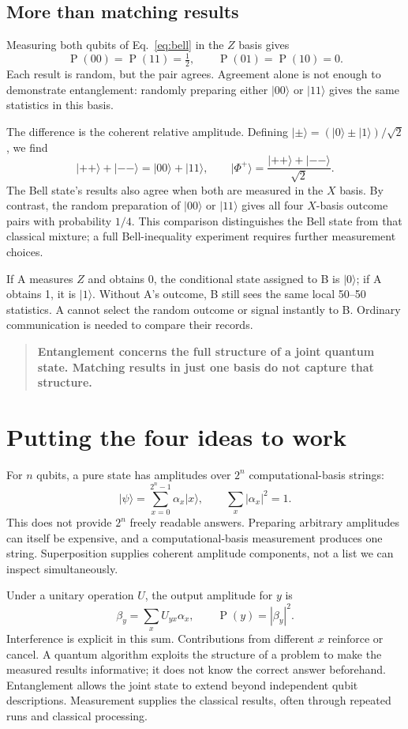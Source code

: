 \documentclass[11pt,a4paper]{article}
\newcommand{\ket}[1]{\lvert #1\rangle}
\newcommand{\Prob}{\mathop{\mathrm{P}}}
\newcommand{\takeaway}[1]{\begin{quote}\color{ink}\textbf{#1}\end{quote}}
\begin{document}
\subsection{More than matching results}
Measuring both qubits of Eq.~\eqref{eq:bell} in the $Z$ basis gives
\[
\Prob(00)=\Prob(11)=\tfrac12,\qquad
\Prob(01)=\Prob(10)=0.
\]
Each result is random, but the pair agrees. Agreement alone is not enough to demonstrate entanglement: randomly preparing either $\ket{00}$ or $\ket{11}$ gives the same statistics in this basis.

The difference is the coherent relative amplitude. Defining $\ket{\pm}=(\ket{0}\pm\ket{1})/\sqrt2$, we find
\[
\ket{++}+\ket{--}=\ket{00}+\ket{11},\qquad
\ket{\Phi^+}=\frac{\ket{++}+\ket{--}}{\sqrt2}.
\]
The Bell state's results also agree when both are measured in the $X$ basis. By contrast, the random preparation of $\ket{00}$ or $\ket{11}$ gives all four $X$-basis outcome pairs with probability $1/4$. This comparison distinguishes the Bell state from that classical mixture; a full Bell-inequality experiment requires further measurement choices.

If A measures $Z$ and obtains 0, the conditional state assigned to B is $\ket{0}$; if A obtains 1, it is $\ket{1}$. Without A's outcome, B still sees the same local 50--50 statistics. A cannot select the random outcome or signal instantly to B. Ordinary communication is needed to compare their records.

\takeaway{Entanglement concerns the full structure of a joint quantum state. Matching results in just one basis do not capture that structure.}

\newpage
\section{Putting the four ideas to work}
For $n$ qubits, a pure state has amplitudes over $2^n$ computational-basis strings:
\begin{equation}
\ket{\psi}=\sum_{x=0}^{2^n-1}\alpha_x\ket{x},\qquad
\sum_x|\alpha_x|^2=1.
\end{equation}
This does not provide $2^n$ freely readable answers. Preparing arbitrary amplitudes can itself be expensive, and a computational-basis measurement produces one string. Superposition supplies coherent amplitude components, not a list we can inspect simultaneously.

Under a unitary operation $U$, the output amplitude for $y$ is
\begin{equation}
\beta_y=\sum_x U_{yx}\alpha_x,\qquad \Prob(y)=|\beta_y|^2.
\end{equation}
Interference is explicit in this sum. Contributions from different $x$ reinforce or cancel. A quantum algorithm exploits the structure of a problem to make the measured results informative; it does not know the correct answer beforehand. Entanglement allows the joint state to extend beyond independent qubit descriptions. Measurement supplies the classical results, often through repeated runs and classical processing.
\end{document}
